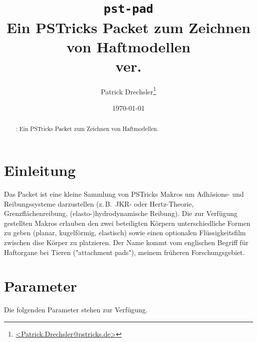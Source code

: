 \documentclass{scrartcl}
\newcommand{\summary}{Ein PSTricks Packet zum Zeichnen von Haftmodellen}
\newcommand{\zB}{z.\,B.~}
\begin{document}
\EnableQuotes

\title{\texttt{pst-pad}\\\summary\\\normalsize ver. \verPstPad} \author{Patrick
  Drechsler\thanks{\url{<Patrick.Drechsler@pstricks.de>}}} \date{\today}
\maketitle

\begin{abstract}
\PadPackage{}: \summary.
\end{abstract}

\setlength{\columnseprule}{0.6pt}
\begin{multicols}{2}
{\parskip 0pt \tableofcontents}
\end{multicols}

\section{Einleitung}
\label{sec:introduction}

Das Packet \PadPackage{} ist eine kleine Sammlung von PSTricks Makros um
Adhäsions- und Reibungssysteme darzustellen (\zB JKR- oder Hertz-Theorie,
Grenzflächenreibung, (elasto-)hydrodynamische Reibung). Die zur Verfügung
gestellten Makros erlauben den zwei beteiligten Körpern unterschiedliche Formen
zu geben (planar, kugelförmig, elastisch) sowie einen optionalen
Flüssigkeitsfilm zwischen dise Körper zu platzieren. Der Name \PadPackage{}
kommt vom englischen Begriff für Haftorgane bei Tieren ("attachment pads"),
meinem früheren Forschungsgebiet.

\section{Parameter}
\label{sec:parameters}

Die folgenden Parameter stehen zur Verfügung.
\end{document}
